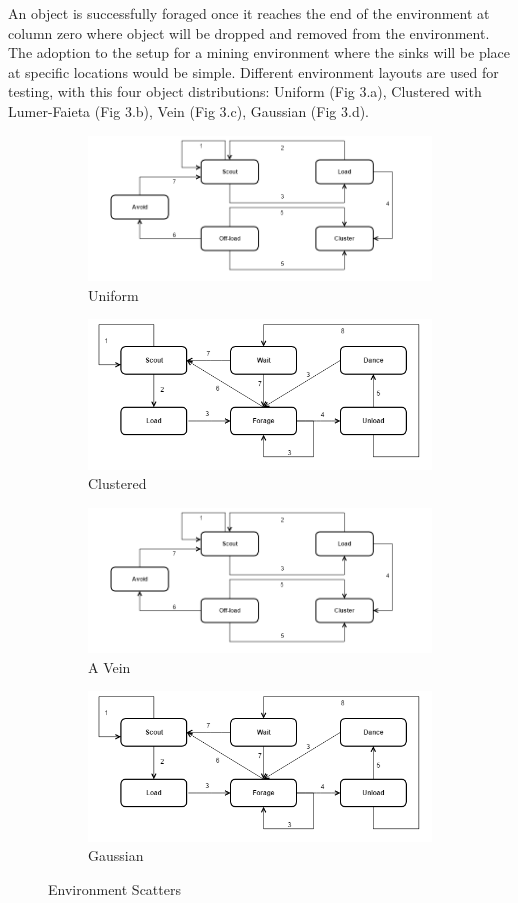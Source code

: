 \documentclass[12pt]{article}
\begin{document}
\par{An object is successfully foraged once it reaches the end of the environment at column zero where object will be dropped and removed from the environment. The adoption to the setup for a mining environment where the sinks will be place at specific locations would be simple. Different environment layouts are used for testing, with this four object distributions: Uniform (Fig 3.a), Clustered with Lumer-Faieta (Fig 3.b), Vein (Fig 3.c), Gaussian (Fig 3.d).}
\\
\begin{figure}[h]
\centering
\begin{subfigure}{0.2\textwidth}
  \centering
  \includegraphics[width=.2\linewidth]{desertant.png}
  \caption{Uniform}
  \label{fig:sub1}
\end{subfigure}%
\begin{subfigure}{.2\textwidth}
  \centering
  \includegraphics[width=.2\linewidth]{honeybee.png}
  \caption{Clustered}
  \label{fig:sub2}
\end{subfigure}
\begin{subfigure}{.2\textwidth}
  \centering
  \includegraphics[width=.2\linewidth]{desertant.png}
  \caption{A Vein}
  \label{fig:sub3}
\end{subfigure}%
\begin{subfigure}{.2\textwidth}
  \centering
  \includegraphics[width=.2\linewidth]{honeybee.png}
  \caption{Gaussian}
  \label{fig:sub4}
\end{subfigure}
\caption{Environment Scatters}
\label{fig:EnvironmentScaters}
\end{figure}

\vspace{0.3cm}
\end{document}
